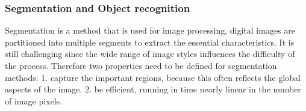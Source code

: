 \subsubsection{Segmentation and Object recognition}


Segmentation \cite{pedro} is a method that is used for image processing, digital images are partitioned into multiple segments to extract the essential characteristics. It is still challenging since the wide range of image styles influences the difficulty of the process. Therefore two properties need to be defined for segmentation methods: 1. capture the important regions, because this often reflects the global aspects of the image. 2. be efficient, running in time nearly linear in the number of image pixels. %



